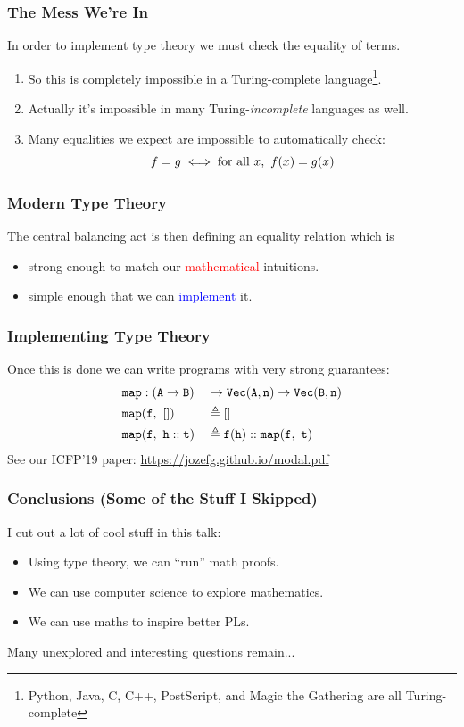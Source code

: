 \documentclass[usenames,dvipsnames,aspectratio=169,12pt]{beamer}
\begin{document}
\begin{frame}
  \frametitle{The Mess We're In}
  In order to implement type theory we must check the equality of terms.
  \begin{enumerate}
  \item So this is completely impossible in a Turing-complete language\footnote{Python, Java, C,
      C++, PostScript, and Magic the Gathering are all Turing-complete}.
  \item Actually it's impossible in many Turing-\emph{incomplete} languages as well.
  \item Many equalities we expect are impossible to automatically check:
    \[
      f = g \iff \text{for all } x,\ f(x) = g(x)
    \]
  \end{enumerate}
\end{frame}

\begin{frame}
  \frametitle{Modern Type Theory}
  The central balancing act is then defining an equality relation which is
  \begin{itemize}
  \item strong enough to match our \textcolor{Red}{mathematical} intuitions.
  \item simple enough that we can \textcolor{Blue}{implement} it.
  \end{itemize}
\end{frame}

\begin{frame}
  \frametitle{Implementing Type Theory}
  Once this is done we can write programs with very strong guarantees:
  \begin{alignat*}{2}
    &\mathtt{map} : (\mathtt{A} \to \mathtt{B}) &&\to \mathtt{Vec}(\mathtt{A}, \mathtt{n}) \to \mathtt{Vec}(\mathtt{B}, \mathtt{n})\\
    &\mathtt{map}(\mathtt{f},\ []) &&\triangleq []\\
    &\mathtt{map}(\mathtt{f},\ \mathtt{h} :: \mathtt{t})
    &&\triangleq \mathtt{f}(\mathtt{h}) :: \mathtt{map}(\mathtt{f},\ \mathtt{t})
  \end{alignat*}
  See our ICFP'19 paper: \url{https://jozefg.github.io/modal.pdf}
\end{frame}

\begin{frame}
  \frametitle{Conclusions (Some of the Stuff I Skipped)}
  I cut out a lot of cool stuff in this talk:
  \begin{itemize}
  \item Using type theory, we can ``run'' math proofs.
  \item We can use computer science to explore mathematics.
  \item We can use maths to inspire better PLs.
  \end{itemize}
  Many unexplored and interesting questions remain...
\end{frame}
\end{document}
